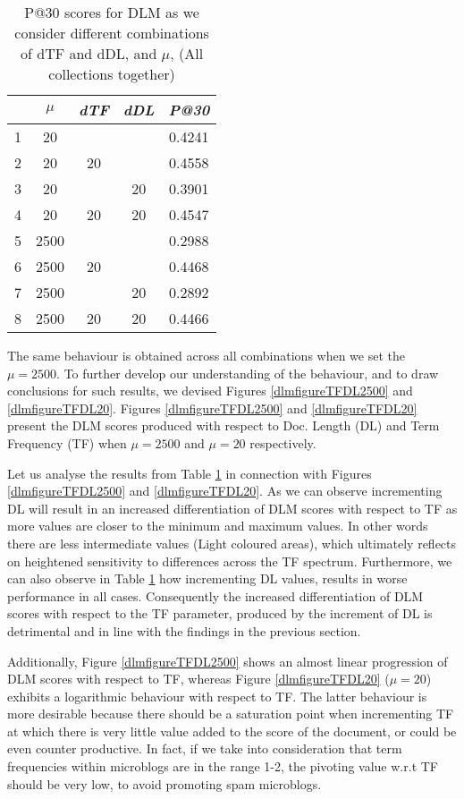 \begin{table}[]
	\caption{P@30 scores for DLM as we consider different combinations of dTF and dDL, and $\mu$, (All collections together)}
	\centering
	\begin{tabular}{l|c|c|c|c} 	
	&
	\textit{\textbf{$\mu$}} & 
	\textit{\textbf{dTF}} & 
	\textit{\textbf{dDL}} & 
	\textit{\textbf{P@30}} 	
	\tabularnewline
	\hline
	1 & 20 &    &    & 0.4241\\
	2 & 20 & 20 &    & 0.4558\\
	3 & 20 &    & 20 & 0.3901\\
	4 & 20 & 20 & 20 & 0.4547\\
	\hline	
	\hline
	5 & 2500 &    &    & 0.2988\\
	6 & 2500 & 20 &    & 0.4468\\
	7 & 2500 &    & 20 & 0.2892\\
	8 & 2500 & 20 & 20 & 0.4466\\
    \hline
	\end{tabular}
	\label{drmdtfmuvalues}
\end{table}

The same behaviour is obtained across all combinations when we set the $\mu = 2500$. To further develop our understanding of the behaviour, and to draw conclusions for such results, we devised Figures \ref{dlmfigureTFDL2500} and \ref{dlmfigureTFDL20}. Figures \ref{dlmfigureTFDL2500} and \ref{dlmfigureTFDL20} present the DLM scores produced with respect to Doc. Length (DL) and Term Frequency (TF) when $\mu=2500$ and $\mu=20$ respectively.

Let us analyse the results from Table \ref{drmdtfmuvalues} in connection with Figures \ref{dlmfigureTFDL2500} and \ref{dlmfigureTFDL20}. As we can observe incrementing DL will result in an increased differentiation of DLM scores with respect to TF as more values are closer to the minimum and maximum values. In other words there are less intermediate values (Light coloured areas), which ultimately reflects on heightened sensitivity to differences across the TF spectrum. Furthermore, we can also observe in Table \ref{drmdtfmuvalues} how incrementing DL values, results in worse performance in all cases. Consequently the increased differentiation of DLM scores with respect to the TF parameter, produced by the increment of DL is detrimental and in line with the findings in the previous section.

Additionally, Figure \ref{dlmfigureTFDL2500} shows an almost linear progression of DLM scores with respect to TF, whereas Figure \ref{dlmfigureTFDL20} ($\mu=20$) exhibits a logarithmic behaviour with respect to TF. The latter behaviour is more desirable because there should be a saturation point when incrementing TF at which there is very little value added to the score of the document, or could be even counter productive. In fact, if we take into consideration that term frequencies within microblogs are in the range 1-2, the pivoting value w.r.t TF should be very low, to avoid promoting spam microblogs.

